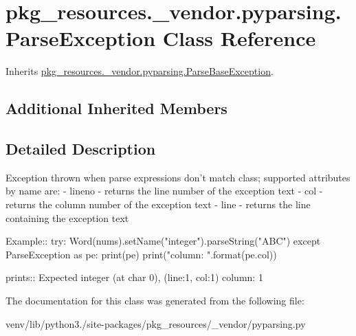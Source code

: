 \hypertarget{classpkg__resources_1_1__vendor_1_1pyparsing_1_1_parse_exception}{}\section{pkg\+\_\+resources.\+\_\+vendor.\+pyparsing.\+Parse\+Exception Class Reference}
\label{classpkg__resources_1_1__vendor_1_1pyparsing_1_1_parse_exception}


Inherits \hyperlink{classpkg__resources_1_1__vendor_1_1pyparsing_1_1_parse_base_exception}{pkg\+\_\+resources.\+\_\+vendor.\+pyparsing.\+Parse\+Base\+Exception}.

\subsection*{Additional Inherited Members}


\subsection{Detailed Description}
\begin{DoxyVerb}Exception thrown when parse expressions don't match class;
supported attributes by name are:
 - lineno - returns the line number of the exception text
 - col - returns the column number of the exception text
 - line - returns the line containing the exception text
    
Example::
    try:
        Word(nums).setName("integer").parseString("ABC")
    except ParseException as pe:
        print(pe)
        print("column: {}".format(pe.col))
        
prints::
   Expected integer (at char 0), (line:1, col:1)
    column: 1
\end{DoxyVerb}
 

The documentation for this class was generated from the following file\+:\begin{DoxyCompactItemize}
\item 
venv/lib/python3./site-\/packages/pkg\+\_\+resources/\+\_\+vendor/pyparsing.\+py\end{DoxyCompactItemize}
